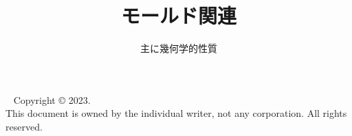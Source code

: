 


\usepackage{refcheck}


\setlength\baselineskip{18pt}
\setlength\normalbaselineskip{\baselineskip}


\titlehead{\hfill\small\customdate}
\subject{--- 計算メモ ---}
\title{\relax
  モールド関連\\[6pt]
  \baselineskip
}
\subtitle{主に幾何学的性質}
\author{}
\date{}
\publishers{}

\maketitle
\thispagestyle{empty}~
\vfill
\noindent
{\scriptsize\relax
Copyright © 2023.\\
This document is owned by the individual writer, not any corporation. All rights reserved.}





\frontmatter



\tableofcontents



\mainmatter





